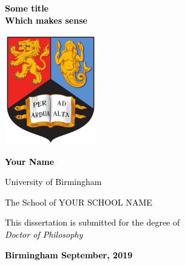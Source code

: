 \begin{titlepage}

    \begin{center}
    \centering
    
        \vspace{1cm}

        \textbf{\Large \textcolor{Black}{Some title \\Which makes sense}} \\

	    \vspace{2cm}
        
        \includegraphics[width=0.3\textwidth]{TitlePage/Fig/uob_logo.png}
        
        \vspace{1.5cm}
        
        \textbf{\textcolor{Black}{\large Your Name}}
        
        \vspace{0.6cm}
        
         \textcolor{Black}{University of Birmingham}
         
         \vspace{0.1cm}
         
         \textcolor{Black}{The School of YOUR SCHOOL NAME}
         
        \vspace{2cm}
        
         \textcolor{Black}{This dissertation is submitted for the degree of \\ \textit{Doctor of Philosophy}}
        
        \vspace{4cm}
        
        \textbf{\textcolor{Black}{Birmingham \hfill September, 2019}}
 
    \end{center}
    
\end{titlepage}
